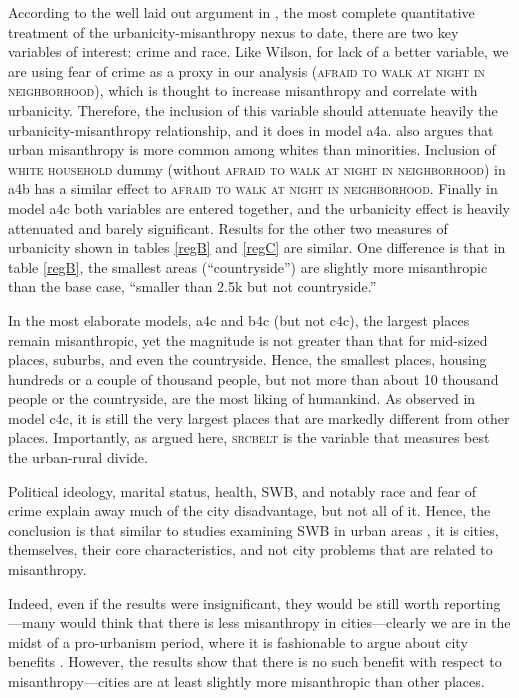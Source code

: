 \documentclass[11pt, letterpaper]{article}
\begin{document}
\begin{spacing}{1.4}
According to the well laid out argument in \citet{wilson85},  the most complete
quantitative treatment of the urbanicity-misanthropy nexus to date, there
are two key variables of interest: crime and race. Like Wilson, for lack of a
better variable, we are using fear of crime as a proxy in our analysis
(\textsc{afraid to walk at night in neighborhood}), which is thought to increase
misanthropy and correlate with urbanicity. Therefore, the inclusion of this
variable should attenuate heavily the urbanicity-misanthropy relationship, and
it does in model a4a. \citet{wilson85} also argues that urban misanthropy is
more common among  whites than minorities. Inclusion of \textsc{white household} dummy 
 (without \textsc{afraid to walk at night in neighborhood}) in a4b has a similar effect to \textsc{afraid to walk at night in neighborhood}. 
 Finally in model a4c both variables are entered together, and the urbanicity effect is heavily attenuated and barely significant. Results for the other two measures of urbanicity shown in tables \ref{regB} and \ref{regC} are similar. One difference is that in table \ref{regB}, the smallest areas (``countryside'') are slightly more misanthropic than the base case, ``smaller than 2.5k but not countryside.''

In the most elaborate models, a4c and b4c  (but not c4c), the largest places remain misanthropic, yet the magnitude is not greater than that for mid-sized places, suburbs, and even the countryside. Hence, the smallest places, housing hundreds or a couple of thousand people, but not more than about
10 thousand people or the countryside, are the most liking of humankind. As observed in model c4c, it is still the very largest places that are markedly different from other places. Importantly, as argued here, \textsc{srcbelt} is the variable that measures best the urban-rural divide. 

Political ideology, marital status, health, SWB, and notably race and fear of crime explain away much of the city disadvantage, but not all of it. Hence, the
conclusion is that similar to studies examining SWB in urban areas \citep{aok_brfss_city_cize16}, it is cities, themselves, their core characteristics, and not city problems that are related to misanthropy. 

Indeed, even if the results were insignificant, they would be still worth reporting---many would think that there is less misanthropy in cities---clearly
we are in the midst of a pro-urbanism period, where it is fashionable to argue about city benefits \citep[e.g.,][]{glaeser11}. However, the results show that there is no such benefit with respect to misanthropy---cities are at least slightly more misanthropic than other places.


\end{spacing}
\end{document}

